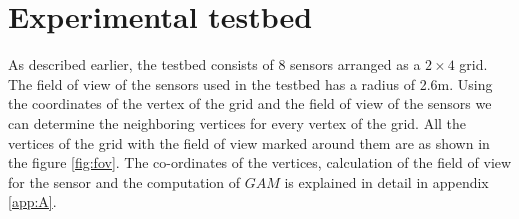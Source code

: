 \section{Experimental testbed}
As described earlier, the testbed consists of 8 sensors arranged as a $2 \times 4$ grid.
The field of view of the sensors used in the testbed has a radius of 2.6m.
Using the coordinates of the vertex of the grid and the field of view of the sensors we can determine the neighboring vertices for every vertex of the grid.
All the vertices of the grid with the field of view marked around them are as shown in the figure \ref{fig:fov}. 
The co-ordinates of the vertices, calculation of the field of view for the sensor and the computation of $GAM$ is explained in detail in appendix \ref{app:A}. 




